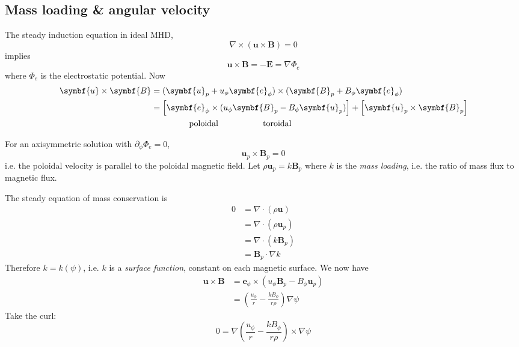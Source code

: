 \documentclass{jknotes}
\newcommand{\B}{\symbf{B}}
\renewcommand{\u}{\symbf{u}}
\begin{document}
\subsection{Mass loading \& angular velocity}
The steady induction equation in ideal MHD,
\begin{equation}
	\nabla \times (\u \times \B) = 0
\end{equation}
implies
\begin{equation}
	\u \times \B = -\symbf{E} = \nabla \Phi_e
\end{equation}
where $\Phi_e$ is the electrostatic potential. Now
\begin{align}
	\u \times \B &= (\u_p + u_\phi \symbf{e}_\phi) \times (\B_p + B_\phi
	\symbf{e}_\phi) \\
				 &= \left[\symbf{e}_\phi \times (u_\phi \B_p - B_\phi
				 \u_p)\right] + \left[ \u_p \times \B_p\right] \\
				&\hspace{4.5em} \text{poloidal} \hspace{5.3em} \text{toroidal}
\end{align}

For an axisymmetric solution with $\partial_\phi \Phi_e = 0$,
\begin{equation}
	\u_p \times \B_p = 0
\end{equation}
i.e. the poloidal velocity is parallel to the poloidal magnetic field. Let
$\rho \u_p = k \B_p$ where $k$ is the \emph{mass loading}, i.e. the ratio of
mass flux to magnetic flux. 

The steady equation of mass conservation is
\begin{align}
	0 &= \nabla \cdot (\rho \u) \\
	  &= \nabla \cdot (\rho \u_p) \\
	  &= \nabla \cdot (k \B_p) \\
	  &= \B_p \cdot \nabla k
\end{align}
Therefore $k = k(\psi)$, i.e. $k$ is a \emph{surface function}, constant on
each magnetic surface. We now have
\begin{align}
	\u \times \B &= \symbf{e}_\phi \times (u_\phi \B_p - B_\phi \u_p) \\
				 &= \left( \frac{u_\phi}{r} - \frac{kB_\phi}{r\rho}\right)
				 \nabla \psi
\end{align}
Take the curl:
\begin{equation}
	0 = \nabla \left( \frac{u_\phi}{r} - \frac{kB_\phi}{r\rho}\right) \times
	\nabla \psi
\end{equation}
\end{document}
